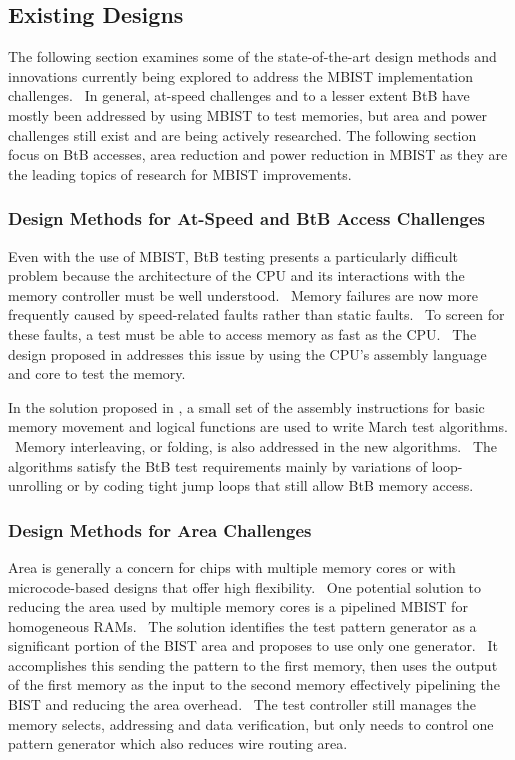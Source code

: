 \subsection{Existing Designs}
The following section examines some of the state-of-the-art design methods and innovations currently being explored to address the MBIST implementation challenges.  In general, at-speed challenges and to a lesser extent BtB have mostly been addressed by using MBIST to test memories, but area and power challenges still exist and are being actively researched.  The following section focus on BtB accesses, area reduction and power reduction in MBIST as they are the leading topics of research for MBIST improvements.

\subsubsection{Design Methods for At-Speed and BtB Access Challenges}
Even with the use of MBIST, BtB testing presents a particularly difficult problem because the architecture of the CPU and its interactions with the memory controller must be well understood.  Memory failures are now more frequently caused by speed-related faults rather than static faults.  To screen for these faults, a test must be able to access memory as fast as the CPU.  The design proposed in \cite{5491773} addresses this issue by using the CPU’s assembly language and core to test the memory.

In the solution proposed in \cite{5491773}, a small set of the assembly instructions for basic memory movement and logical functions are used to write March test algorithms.  Memory interleaving, or folding, is also addressed in the new algorithms.  The algorithms satisfy the BtB test requirements mainly by variations of loop-unrolling or by coding tight jump loops that still allow BtB memory access.     

\subsubsection{Design Methods for Area Challenges}
Area is generally a concern for chips with multiple memory cores or with microcode-based designs that offer high flexibility.  One potential solution \cite{4711617} to reducing the area used by multiple memory cores is a pipelined MBIST for homogeneous RAMs.  The solution identifies the test pattern generator as a significant portion of the BIST area and proposes to use only one generator.  It accomplishes this sending the pattern to the first memory, then uses the output of the first memory as the input to the second memory effectively pipelining the BIST and reducing the area overhead.  The test controller still manages the memory selects, addressing and data verification, but only needs to control one pattern generator which also reduces wire routing area.

